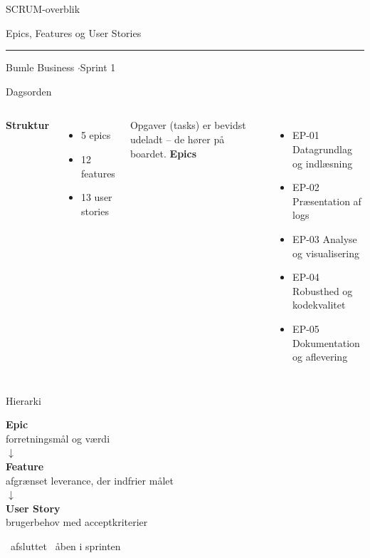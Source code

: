 \documentclass[aspectratio=169,10pt]{beamer}
\newcommand{\done}{\textcolor{accent}{\faCheckCircle}}
\newcommand{\open}{\textcolor{muted}{\faCircle}}
\begin{document}
\begin{frame}
  \vfill
  {\color{accent}\Huge SCRUM-overblik\par}
  \vspace{0.4em}
  {\color{muted}\Large Epics, Features og User Stories\par}
  \vspace{1.6em}
  \textcolor{accent}{\rule{4cm}{2pt}}
  \vfill
  {\small Bumle Business \quad$\cdot$\quad Sprint 1\par}
\end{frame}

\begin{frame}{Dagsorden}
  \begin{columns}[T]
    \textbf{Struktur}
    \vspace{0.4em}
    \begin{itemize}
      \item 5 epics
      \item 12 features
      \item 13 user stories
    \end{itemize}
    \vspace{0.2em}
    {\footnotesize\color{muted}Opgaver (tasks) er bevidst udeladt -- de hører på boardet.}
    \textbf{Epics}
    \vspace{0.4em}
    \begin{itemize}
      \item EP-01 Datagrundlag og indlæsning
      \item EP-02 Præsentation af logs
      \item EP-03 Analyse og visualisering
      \item EP-04 Robusthed og kodekvalitet
      \item EP-05 Dokumentation og aflevering
    \end{itemize}
  \end{columns}
\end{frame}

\begin{frame}{Hierarki}
  \begin{center}
    \Large
    \textcolor{accent}{\textbf{Epic}}\\[0.2em]
    \footnotesize forretningsmål og værdi\\[0.7em]
    $\downarrow$\\[0.7em]
    \textcolor{accent}{\textbf{Feature}}\\[0.2em]
    \footnotesize afgrænset leverance, der indfrier målet\\[0.7em]
    $\downarrow$\\[0.7em]
    \textcolor{accent}{\textbf{User Story}}\\[0.2em]
    \footnotesize brugerbehov med acceptkriterier
  \end{center}
  \vfill
  {\footnotesize\color{muted}\done{}~afsluttet \quad \open{}~åben i sprinten}
\end{frame}
\end{document}
